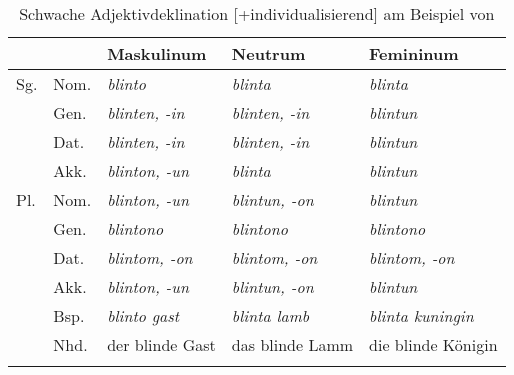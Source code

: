 \begin{table}

\begin{tabular}{lllll}
\lsptoprule
                  &               & \multicolumn{1}{l}{{Maskulinum}}  & \multicolumn{1}{l}{{Neutrum}}     & \multicolumn{1}{l}{{Femininum}}       \\ \midrule
{Sg.} & {Nom.} & \textit{blinto}                          & \textit{blinta}                          & \textit{blinta}                              \\
                  & {Gen.} & \textit{blinten, -in}                    & \textit{blinten, -in}                    & \textit{blintun}                             \\
                  & {Dat.} & \textit{blinten, -in}                    & \textit{blinten, -in}                    & \textit{blintun}                             \\
                  & {Akk.} & \textit{blinton, -un}                    & \textit{blinta}                          & \textit{blintun}                             \\
{Pl.}   & {Nom.} & \textit{blinton, -un}                    & \textit{blintun, -on}                    & \textit{blintun}                             \\
                  & {Gen.} & \textit{blintono}                        & \textit{blintono}                        & \textit{blintono}                            \\
                  & {Dat.} & \textit{blintom, -on}                    & \textit{blintom, -on}                    & \textit{blintom, -on}                        \\
                  & {Akk.} & \textit{blinton, -un}                    & \textit{blintun, -on}                    & \textit{blintun}                             \\\midrule
                  & {Bsp.} & \multicolumn{1}{l}{\textit{blinto gast}} & \multicolumn{1}{l}{\textit{blinta lamb}} & \multicolumn{1}{l}{\textit{blinta kuningin}} \\
                  & {Nhd.}          & \multicolumn{1}{l}{der blinde Gast}      & \multicolumn{1}{l}{das blinde Lamm}      & \multicolumn{1}{l}{die blinde Königin}       \\ \lspbottomrule
\end{tabular}
\caption{Schwache   Adjektivdeklination [+individualisierend] am Beispiel von   \parencite[226]{Braune2004}}
\label{tab:schwach-adj}
\end{table}

